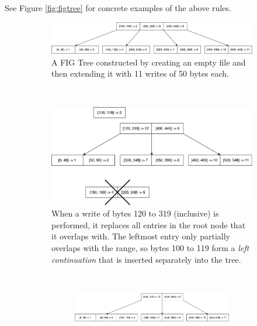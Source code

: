 \documentclass{acm_proc_article-sp}
\begin{document}
See Figure \ref{fig:figtree} for concrete examples of the above rules.

\begin{figure}
    \centering
    \begin{subfigure}[b]{0.60\textwidth}
        \includegraphics[width=\columnwidth]{figtree1.pdf}
        \caption{A FIG Tree constructed by creating an empty file and then extending it with 11 writes of 50 bytes each.}
        \label{fig:initfigtree}
    \end{subfigure}
    ~ %
    \begin{subfigure}[b]{0.46\textwidth}
        \includegraphics[width=\columnwidth]{figtree2.pdf}
        \caption{When a write of bytes 120 to 319 (inclusive) is performed, it replaces all entries in the root node that it overlaps with. The leftmost entry only partially overlaps with the range, so bytes 100 to 119 form a \emph{left continuation} that is inserted separately into the tree.}
        \label{fig:partialwritefigtree}
    \end{subfigure}
    ~ %
    \begin{subfigure}[b]{0.52\textwidth}
        \begin{subfigure}[b]{\textwidth}
            \includegraphics[width=\columnwidth]{figtree3.pdf}

\end{subfigure}
\end{subfigure}
\end{figure}
\end{document}
